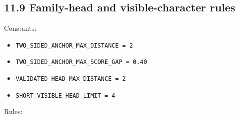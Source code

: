\subsection{11.9 Family-head and visible-character rules}\label{119-family-head-and-visible-character-rules}

Constants:

\begin{itemize}
\tightlist
\item
  \texttt{TWO\_\allowbreak{}SIDED\_\allowbreak{}ANCHOR\_\allowbreak{}MAX\_\allowbreak{}DISTANCE\ =\ 2}
\item
  \texttt{TWO\_\allowbreak{}SIDED\_\allowbreak{}ANCHOR\_\allowbreak{}MAX\_\allowbreak{}SCORE\_\allowbreak{}GAP\ =\ 0.40}
\item
  \texttt{VALIDATED\_\allowbreak{}HEAD\_\allowbreak{}MAX\_\allowbreak{}DISTANCE\ =\ 2}
\item
  \texttt{SHORT\_\allowbreak{}VISIBLE\_\allowbreak{}HEAD\_\allowbreak{}LIMIT\ =\ 4}
\end{itemize}

Rules:

